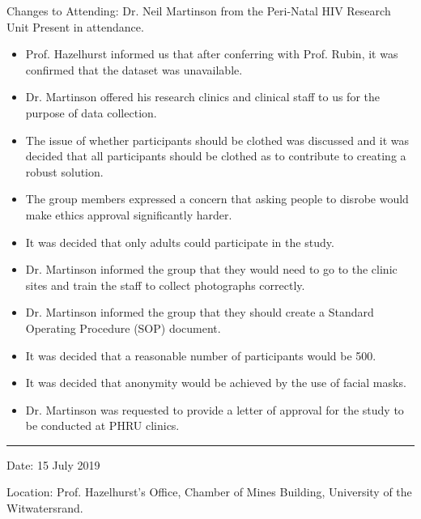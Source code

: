 \documentclass[conference, onecolumn]{IEEEtran}
\begin{document}
Changes to Attending: Dr. Neil Martinson from the Peri-Natal HIV Research Unit Present in attendance.
\begin{itemize}
	\item Prof. Hazelhurst informed us that after conferring with Prof. Rubin, it was confirmed that the dataset was unavailable.
	\item Dr. Martinson offered his research clinics and clinical staff to us for the purpose of data collection.
	\item The issue of whether participants should be clothed was discussed and it was decided that all participants should be clothed as to contribute to creating a robust solution.
	\item The group members expressed a concern that asking people to disrobe would make ethics approval significantly harder.
	\item It was decided that only adults could participate in the study.
	\item Dr. Martinson informed the group that they would need to go to the clinic sites and train the staff to collect photographs correctly.
	\item Dr. Martinson informed the group that they should create a Standard Operating Procedure (SOP) document.
	\item It was decided that a reasonable number of participants would be 500.
	\item It was decided that anonymity would be achieved by the use of facial masks.
	\item Dr. Martinson was requested to provide a letter of approval for the study to be conducted at PHRU clinics.
\end{itemize}

\rule{\linewidth}{2pt}

Date: 15 July 2019

Location: Prof. Hazelhurst's Office, Chamber of Mines Building, University of the Witwatersrand.
\end{document}
